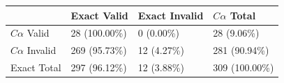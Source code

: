 \begin{tabular}{llll}
\toprule
 & Exact Valid & Exact Invalid & $C\alpha$ Total \\
\midrule
$C\alpha$ Valid & 28 (100.00\%) & 0 (0.00\%) & 28 (9.06\%) \\
$C\alpha$ Invalid & 269 (95.73\%) & 12 (4.27\%) & 281 (90.94\%) \\
Exact Total & 297 (96.12\%) & 12 (3.88\%) & 309 (100.00\%) \\
\bottomrule
\end{tabular}
